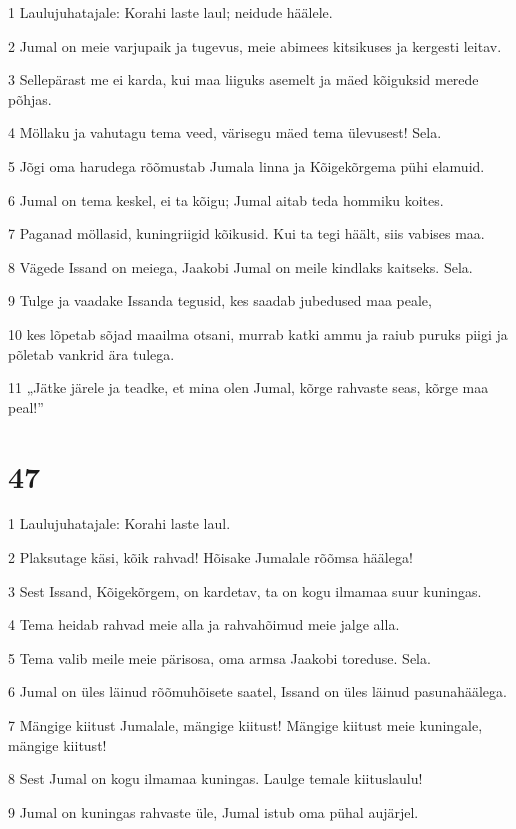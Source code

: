 \par 1 Laulujuhatajale: Korahi laste laul; neidude häälele.
\par 2 Jumal on meie varjupaik ja tugevus, meie abimees kitsikuses ja kergesti leitav.
\par 3 Sellepärast me ei karda, kui maa liiguks asemelt ja mäed kõiguksid merede põhjas.
\par 4 Möllaku ja vahutagu tema veed, värisegu mäed tema ülevusest! Sela.
\par 5 Jõgi oma harudega rõõmustab Jumala linna ja Kõigekõrgema pühi elamuid.
\par 6 Jumal on tema keskel, ei ta kõigu; Jumal aitab teda hommiku koites.
\par 7 Paganad möllasid, kuningriigid kõikusid. Kui ta tegi häält, siis vabises maa.
\par 8 Vägede Issand on meiega, Jaakobi Jumal on meile kindlaks kaitseks. Sela.
\par 9 Tulge ja vaadake Issanda tegusid, kes saadab jubedused maa peale,
\par 10 kes lõpetab sõjad maailma otsani, murrab katki ammu ja raiub puruks piigi ja põletab vankrid ära tulega.
\par 11 „Jätke järele ja teadke, et mina olen Jumal, kõrge rahvaste seas, kõrge maa peal!”

\chapter{47}

\par 1 Laulujuhatajale: Korahi laste laul.
\par 2 Plaksutage käsi, kõik rahvad! Hõisake Jumalale rõõmsa häälega!
\par 3 Sest Issand, Kõigekõrgem, on kardetav, ta on kogu ilmamaa suur kuningas.
\par 4 Tema heidab rahvad meie alla ja rahvahõimud meie jalge alla.
\par 5 Tema valib meile meie pärisosa, oma armsa Jaakobi toreduse. Sela.
\par 6 Jumal on üles läinud rõõmuhõisete saatel, Issand on üles läinud pasunahäälega.
\par 7 Mängige kiitust Jumalale, mängige kiitust! Mängige kiitust meie kuningale, mängige kiitust!
\par 8 Sest Jumal on kogu ilmamaa kuningas. Laulge temale kiituslaulu!
\par 9 Jumal on kuningas rahvaste üle, Jumal istub oma pühal aujärjel.

